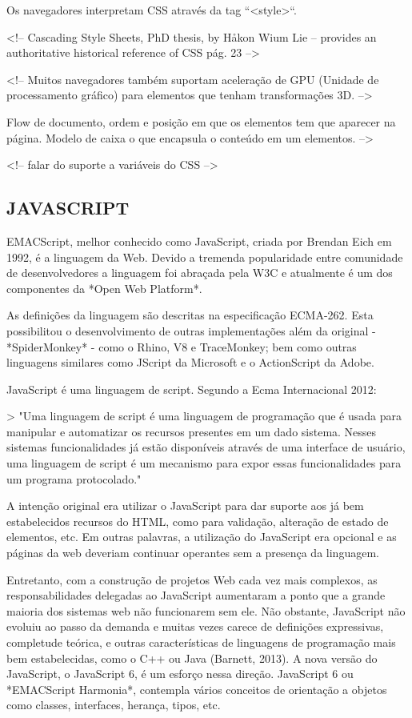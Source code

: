 \documentclass[11pt,a4paper]{article}
\begin{document}
Os navegadores interpretam CSS através da tag ``<style>``.

<!-- Cascading Style Sheets, PhD thesis, by Håkon Wium Lie – provides
an authoritative historical reference of CSS pág. 23 -->

<!-- Muitos navegadores também suportam aceleração de GPU (Unidade de
processamento gráfico) para elementos que tenham transformações 3D.
-->

Flow de documento, ordem e posição em que os elementos tem que
aparecer na página. Modelo de caixa o que encapsula o conteúdo em um
elementos. -->

<!-- falar do suporte a variáveis do CSS -->


\subsection{JAVASCRIPT}

EMACScript, melhor conhecido como JavaScript, criada por Brendan Eich
em 1992, é a linguagem da Web. Devido a tremenda popularidade entre
comunidade de desenvolvedores a linguagem foi abraçada pela W3C e
atualmente é um dos componentes da *Open Web Platform*.

As definições da linguagem são descritas na especificação ECMA-262.
Esta possibilitou o desenvolvimento de outras implementações além da
original - *SpiderMonkey* - como o Rhino, V8 e TraceMonkey; bem como
outras linguagens similares como JScript da Microsoft e o ActionScript
da Adobe.

JavaScript é uma linguagem de script. Segundo a Ecma Internacional
2012:

> "Uma linguagem de script é uma linguagem de programação que é
usada para manipular e automatizar os recursos presentes em um dado
sistema. Nesses sistemas funcionalidades já estão disponíveis
através de uma interface de usuário, uma linguagem de script é
um mecanismo para expor essas funcionalidades para um programa
protocolado."

A intenção original era utilizar o JavaScript para dar suporte aos já
bem estabelecidos recursos do HTML, como para validação, alteração
de estado de elementos, etc. Em outras palavras, a utilização do
JavaScript era opcional e as páginas da web deveriam continuar
operantes sem a presença da linguagem.

Entretanto, com a construção de projetos Web cada vez mais complexos,
as responsabilidades delegadas ao JavaScript aumentaram a ponto que a
grande maioria dos sistemas web não funcionarem sem ele. Não obstante,
JavaScript não evoluiu ao passo da demanda e muitas vezes carece de
definições expressivas, completude teórica, e outras características
de linguagens de programação mais bem estabelecidas, como o C++ ou
Java (Barnett, 2013). A nova versão do JavaScript, o JavaScript 6, é
um esforço nessa direção. JavaScript 6 ou *EMACScript Harmonia*,
contempla vários conceitos de orientação a objetos como classes,
interfaces, herança, tipos, etc.
\end{document}
